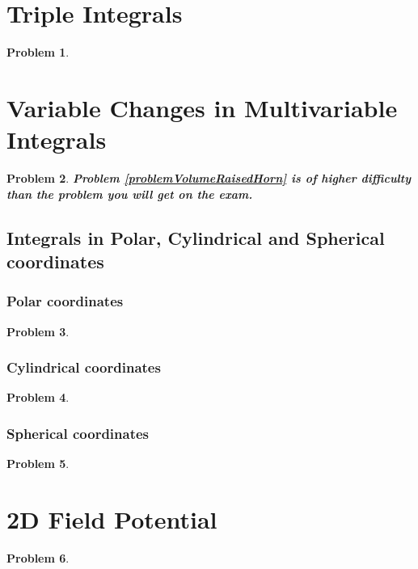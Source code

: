 \documentclass{article}
\newtheorem{problem}{Problem}
\begin{document}
\section{Triple Integrals}
\begin{problem}

\end{problem}

\section{Variable Changes in Multivariable Integrals}
\begin{problem}
\textbf{Problem \ref{problemVolumeRaisedHorn} is of higher difficulty than the problem you will get on the exam.}


\end{problem}

\subsection{Integrals in Polar, Cylindrical and Spherical coordinates}
\subsubsection{Polar coordinates}
\begin{problem}

\end{problem}
\subsubsection{Cylindrical coordinates}
\begin{problem}

\end{problem}
\subsubsection{Spherical coordinates}
\begin{problem}

\end{problem}
\section{2D Field Potential}
\begin{problem}

\end{problem}
\end{document}
